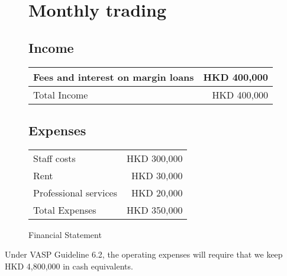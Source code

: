 \begin{figure}[h]
  \centering
  \caption{Financial Statement}
  \label{fig:financial_statement}
  
  \section*{Monthly trading }
  
  \subsection*{Income}
  \begin{tabular}{lr}
    Fees and interest on margin loans & HKD 400,000 \\
    \midrule
    Total Income & HKD 400,000 \\
  \end{tabular}
  
  \subsection*{Expenses}
  \begin{tabular}{lr}
    Staff costs & HKD 300,000 \\
    Rent & HKD 30,000 \\
    Professional services & HKD 20,000 \\
    \midrule
    Total Expenses & HKD 350,000 \\
  \end{tabular}
\end{figure}

Under VASP Guideline 6.2, the operating expenses will require that we keep
HKD 4,800,000 in cash equivalents.
